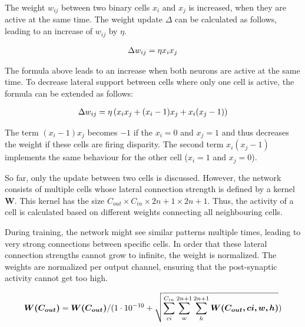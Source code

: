 The weight $w_{ij}$ between two binary cells $x_i$ and $x_j$ is increased, when they are active at the same time. The weight update $\Delta$ can be calculated as follows, leading to an increase of $w_{ij}$ by $\eta$.

\begin{align}\eqlbl{hebbu_1}
	\Delta w_{ij} = \eta x_i x_j
\end{align}

The formula above leads to an increase when both neurons are active at the same time. To decrease lateral support between cells where only one cell is active, the formula can be extended as follows:

\begin{align}\eqlbl{hebbu_2}
	\Delta w_{ij} = \eta \left( x_i x_j + (x_i-1) x_j + x_i (x_j -1) \right)
\end{align}

The term $(x_i-1) x_j$ becomes $-1$ if the $x_i=0$ and $x_j=1$ and thus decreases the weight if these cells are firing disparity. The second term $x_i (x_j -1)$ implements the same behaviour for the other cell ($x_i=1$ and $x_j=0$).

So far, only the update between two cells is discussed. However, the network consists of multiple cells whose lateral connection strength is defined by a kernel $\boldsymbol{W}$. This kernel has the size $C_{out} \times C_{in} \times 2n+1 \times 2n+1$. Thus, the activity of a cell is calculated based on different weights connecting all neighbouring cells.

During training, the network might see similar patterns multiple times, leading to very strong connections between specific cells. In order that these lateral connection strengths cannot grow to infinite, the weight is normalized. The weights are normalized per output channel, ensuring that the post-synaptic activity cannot get too high. 

\begin{align}\eqlbl{hebbu_2}
	\boldsymbol{W(C_{out})} = \boldsymbol{W(C_{out})} / (1\cdot 10^{-10} + \sqrt{\sum_{ci}^{C_{in}}\sum_{w}^{2n+1}\sum_{h}^{2n+1} \boldsymbol{W(C_{out},ci,w,h)}})
\end{align}


